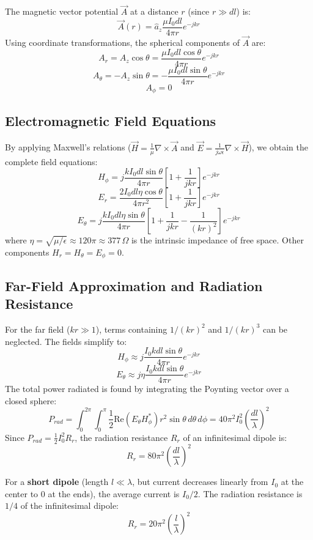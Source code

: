\documentclass[12pt,a4paper]{article}
\begin{document}
The magnetic vector potential $\vec{A}$ at a distance $r$ (since $r \gg dl$) is:
\[
\vec{A}(r) = \hat{a}_z \frac{\mu I_0 dl}{4\pi r} e^{-jkr}
\]
Using coordinate transformations, the spherical components of $\vec{A}$ are:
\[
A_r = A_z \cos\theta = \frac{\mu I_0 dl \cos\theta}{4\pi r} e^{-jkr}
\]
\[
A_\theta = -A_z \sin\theta = -\frac{\mu I_0 dl \sin\theta}{4\pi r} e^{-jkr}
\]
\[
A_\phi = 0
\]

\subsection{Electromagnetic Field Equations}
By applying Maxwell's relations ($\vec{H} = \frac{1}{\mu} \nabla \times \vec{A}$ and $\vec{E} = \frac{1}{j\omega\epsilon} \nabla \times \vec{H}$), we obtain the complete field equations:
\[
H_\phi = j \frac{k I_0 dl \sin\theta}{4\pi r} \left[ 1 + \frac{1}{jkr} \right] e^{-jkr}
\]
\[
E_r = \frac{2 I_0 dl \eta \cos\theta}{4\pi r^2} \left[ 1 + \frac{1}{jkr} \right] e^{-jkr}
\]
\[
E_\theta = j \frac{k I_0 dl \eta \sin\theta}{4\pi r} \left[ 1 + \frac{1}{jkr} - \frac{1}{(kr)^2} \right] e^{-jkr}
\]
where $\eta = \sqrt{\mu/\epsilon} \approx 120\pi \approx 377\,\Omega$ is the intrinsic impedance of free space. Other components $H_r = H_\theta = E_\phi = 0$.

\subsection{Far-Field Approximation and Radiation Resistance}
For the far field ($kr \gg 1$), terms containing $1/(kr)^2$ and $1/(kr)^3$ can be neglected. The fields simplify to:
\[
H_\phi \approx j \frac{I_0 k dl \sin\theta}{4\pi r} e^{-jkr}
\]
\[
E_\theta \approx j \eta \frac{I_0 k dl \sin\theta}{4\pi r} e^{-jkr}
\]
The total power radiated is found by integrating the Poynting vector over a closed sphere:
\[
P_{rad} = \int_{0}^{2\pi}\int_{0}^{\pi} \frac{1}{2} \text{Re}(E_\theta H_\phi^*) r^2 \sin\theta \, d\theta \, d\phi = 40 \pi^2 I_0^2 \left(\frac{dl}{\lambda}\right)^{\!2}
\]
Since $P_{rad} = \frac{1}{2} I_0^2 R_r$, the radiation resistance $R_r$ of an infinitesimal dipole is:
\[
R_r = 80 \pi^2 \left(\frac{dl}{\lambda}\right)^{\!2}
\]

\begin{tcolorbox}[defbox, title={\textbf{Note: The Short Dipole}}]
For a \textbf{short dipole} (length $l \ll \lambda$, but current decreases linearly from $I_0$ at the center to $0$ at the ends), the average current is $I_0/2$. The radiation resistance is $1/4$ of the infinitesimal dipole:
\[
R_r = 20\pi^2 \left(\frac{l}{\lambda}\right)^{\!2}
\]
\end{tcolorbox}
\end{document}
